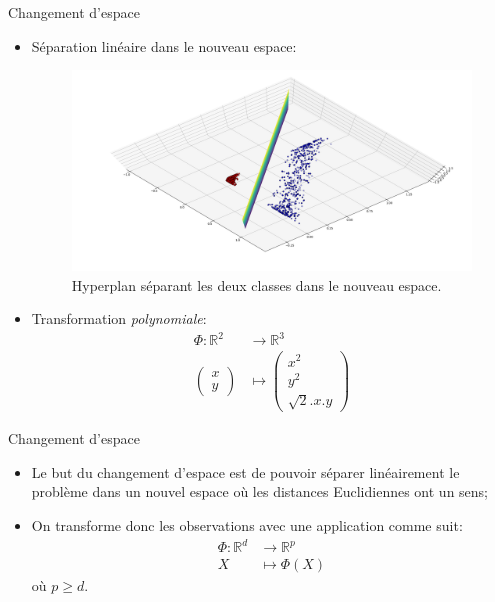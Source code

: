 \documentclass[8pt]{beamer}
\begin{document}
	\begin{frame}[plain]{Changement d'espace}
		\begin{itemize}
			\item <1-> Séparation linéaire dans le nouveau espace:
			\begin{figure}[H]
				\includegraphics[width=.7\textwidth]{images/samples/separation_pol_2_3}
				\caption*{\label{fig::pol_take_3} Hyperplan séparant les deux classes dans le nouveau espace.}

			\end{figure}
			\item <2-> Transformation \textit{polynomiale}:
			\begin{align*}
				\Phi: \mathbb{R}^2 &\rightarrow \mathbb{R}^3 \\
				\begin{pmatrix}
					x \\
					y
				\end{pmatrix} &\mapsto \begin{pmatrix}
					x^2 \\
					y^2 \\
					\sqrt{2}.x.y
				\end{pmatrix}
			\end{align*}
		\end{itemize}
	\end{frame}
	\begin{frame}{Changement d'espace}
		\begin{itemize}
			\item  Le but du changement d'espace est de pouvoir séparer linéairement le problème dans un nouvel espace où les distances Euclidiennes ont un sens;
			\item  On transforme donc les observations avec une application comme suit:
			\begin{align*}
				\Phi: \mathbb{R}^d &\rightarrow \mathbb{R}^p \\
				X &\mapsto \Phi(X)
			\end{align*}
			où $p\geq d$.
		\end{itemize}
	\end{frame}
\end{document}
